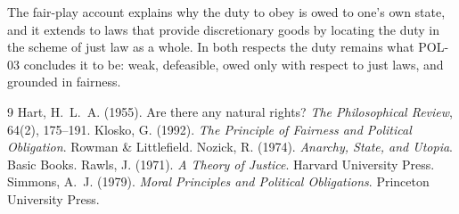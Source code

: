 \documentclass{situationist-preprint}
\begin{document}
The fair-play account explains why the duty to obey is owed to one's own state, and it extends to laws that provide discretionary goods by locating the duty in the scheme of just law as a whole. In both respects the duty remains what POL-03 concludes it to be: weak, defeasible, owed only with respect to just laws, and grounded in fairness.

\begin{thebibliography}{9}
 Hart, H.~L.~A. (1955). Are there any natural rights? \emph{The Philosophical Review}, 64(2), 175--191.
 Klosko, G. (1992). \emph{The Principle of Fairness and Political Obligation}. Rowman \& Littlefield.
 Nozick, R. (1974). \emph{Anarchy, State, and Utopia}. Basic Books.
 Rawls, J. (1971). \emph{A Theory of Justice}. Harvard University Press.
 Simmons, A.~J. (1979). \emph{Moral Principles and Political Obligations}. Princeton University Press.
\end{thebibliography}
\end{document}
